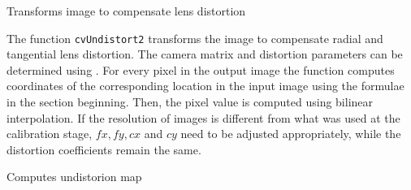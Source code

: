 \label{Undistort2}

Transforms image to compensate lens distortion


\begin{description}
\end{description}

The function \texttt{cvUndistort2} transforms the image to compensate
radial and tangential lens distortion. The camera matrix and
distortion parameters can be determined using
. For every
pixel in the output image the function computes coordinates of the
corresponding location in the input image using the formulae in the
section beginning. Then, the pixel value is computed using bilinear
interpolation. If the resolution of images is different from what
was used at the calibration stage, $fx, fy, cx$ and $cy$
need to be adjusted appropriately, while the distortion coefficients
remain the same.

\label{InitUndistortMap}

Computes undistorion map


\begin{description}
\end{description}

